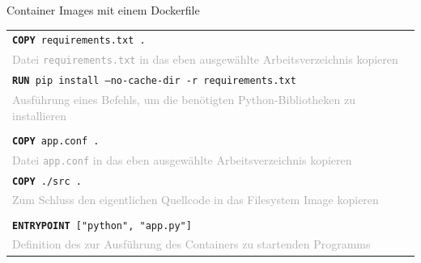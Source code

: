 {\begin{frame}{Container Images mit einem Dockerfile}
{\begin{tabular}{|p{\textwidth}|}
        \cellcolor{gray!15}
        \texttt{\textbf{COPY} requirements.txt .} \\
        \cellcolor{gray!15}
        \textcolor{darkgray}{Datei \texttt{requirements.txt} in das eben ausgewählte Arbeitsverzeichnis kopieren} \\

        \cellcolor{gray!15}
        \texttt{\textbf{RUN} pip install --no-cache-dir -r requirements.txt} \\
        \cellcolor{gray!15}
        \textcolor{darkgray}{Ausführung eines Befehls, um die benötigten Python-Bibliotheken zu installieren} \\

        \cellcolor{gray!7}
        \\

        \cellcolor{gray!15}
        \texttt{\textbf{COPY} app.conf .} \\
        \cellcolor{gray!15}
        \textcolor{darkgray}{Datei \texttt{app.conf} in das eben ausgewählte Arbeitsverzeichnis kopieren} \\

        \cellcolor{gray!15}
        \texttt{\textbf{COPY} ./src .} \\
        \cellcolor{gray!15}
        \textcolor{darkgray}{Zum Schluss den eigentlichen Quellcode in das Filesystem Image kopieren} \\

        \cellcolor{gray!7}
        \\

        \cellcolor{gray!15}
        \texttt{\textbf{ENTRYPOINT} ["python", "app.py"]} \\
        \cellcolor{gray!15}
        \textcolor{darkgray}{Definition des zur Ausführung des Containers zu startenden Programms} \\
        \hline
    \end{tabular}
    }
\end{frame}
}

